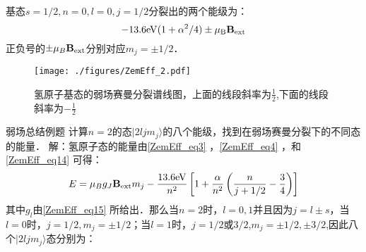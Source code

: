 \begin{example}{}
基态$s=1/2,n=0,l=0,j=1/2$分裂出的两个能级为：
\begin{equation}
-13.6\rm{eV}(1+\alpha^2/4)\pm\mu_B\mathbf{B}_{\rm{ext}}\notag
\end{equation}
正负号的$\pm\mu_B\mathbf{B}_{\rm{ext}}$分别对应$m_j=\pm1/2$．\begin{figure}[ht]
\centering
\texttt{[image: ./figures/ZemEff\_2.pdf]}
\caption{氢原子基态的弱场赛曼分裂谱线图，上面的线段斜率为$\frac{1}{2}$,下面的线段斜率为$-\frac{1}{2}$} \label{ZemEff_fig2}
\end{figure}
\end{example}
\begin{example}{弱场总结例题}
计算$n=2$的态$|2ljm_j\rangle$的八个能级，找到在弱场赛曼分裂下的不同态的能量．
解：氢原子态的能量由\autoref{ZemEff_eq3} ，\autoref{ZemEff_eq4} ，和\autoref{ZemEff_eq14} 可得：
\begin{equation}
E=\mu_Bg_J\mathbf{B}_{\rm{ext}}m_j-\frac{13.6\rm{eV}}{n^2}\left[1+\frac{\alpha}{n^2}\left(\frac{n}{j+1/2}-\frac{3}{4}\right)\right]
\end{equation}
其中$g_l$由\autoref{ZemEff_eq15} 所给出．那么当$n=2$时，$l=0,1$并且因为$j=l\pm s$，当$l=0$时，$j=1/2,m_j=\pm 1/2$；当$l=1$时，$j=1/2$或$3/2$,$m_j=\pm 1/2,\pm 3/2$,因此八个$|2ljm_j\rangle$态分别为：
\begin{equation}

\end{equation}

\end{example}
